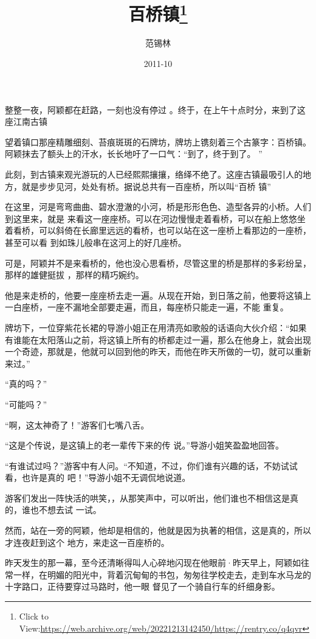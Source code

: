\documentclass{article}
\title{百桥镇\footnote{Click to View:\url{https://web.archive.org/web/20221213142450/https://rentry.co/q4qvr}}}
\author{范锡林}
\date{2011-10}
\begin{document}

\maketitle


\Large

﻿整整一夜，阿颖都在赶路，一刻也没有停过
。终于，在上午十点时分，来到了这座江南古镇 

望着镇口那座精雕细刻、苔痕斑斑的石牌坊，牌坊上镌刻着三个古篆字：百桥镇。阿颖抹去了额头上的汗水，长长地吁了一口气：“到了，终于到了。
” 

此刻，到古镇来观光游玩的人已经熙熙攘攘，络绎不绝了。这座古镇最吸引人的地方，就是步步见河，处处有桥。据说总共有一百座桥，所以叫“百桥
镇” 

在这里，河是弯弯曲曲、碧水澄澈的小河，桥是形形色色、造型各异的小桥。人们到这里来，就是
\newpage
来看这一座座桥。可以在河边慢慢走着看桥，可以在船上悠悠坐着看桥，可以斜倚在长廊里远远的看桥，也可以站在这一座桥上看那边的一座桥，甚至可以看
到如珠儿般串在这河上的好几座桥。 

可是，阿颖并不是来看桥的，他也没心思看桥，尽管这里的桥是那样的多彩纷呈，那样的雄健挺拔
，那样的精巧婉约。 

他是来走桥的，他要一座座桥去走一遍。从现在开始，到日落之前，他要将这镇上一白座桥，一座不漏地全部要走遍，而且，每座桥只能走一遍，不能
重复。 

牌坊下，一位穿紫花长裙的导游小姐正在用清亮如歌般的话语向大伙介绍：“如果有谁能在太阳落山之前，将这镇上所有的桥都走过一遍，那么在他身上，就会出现一个奇迹，那就是，他就可以回到他的昨天，而他在昨天所做的一切，就可以重新来过。”
 

\newpage


“真的吗？” 


“可能吗？” 


“啊，这太神奇了！”游客们七嘴八舌。 

“这是个传说，是这镇上的老一辈传下来的传
说。”导游小姐笑盈盈地回答。 

“有谁试过吗？”游客中有人问。“不知道，不过，你们谁有兴趣的话，不妨试试看，也许是真的
吧！”导游小姐不无调侃地说道。 

游客们发出一阵快活的哄笑，，从那笑声中，可以听出，他们谁也不相信这是真的，谁也不想去试
一试。 

然而，站在一旁的阿颖，他却是相信的，他就是因为执著的相信，这是真的，所以才连夜赶到这个
地方，来走这一百座桥的。 

\newpage

昨天发生的那一幕，至今还清晰得叫人心碎地闪现在他眼前·昨天早上，阿颖如往常一样，在明媚的阳光中，背着沉甸甸的书包，匆匆往学校走去，走到车水马龙的十字路口，正待要穿过马路时，他一眼
督见了一个骑自行车的纤细身影。 
\end{document}
